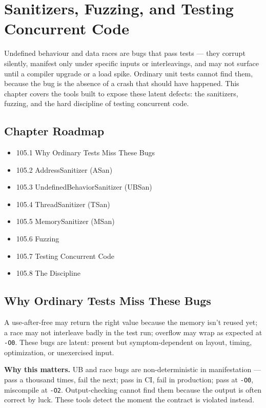 \chapter{Sanitizers, Fuzzing, and Testing Concurrent Code}

Undefined behaviour and data races are bugs that pass tests --- they corrupt silently, manifest only under specific inputs or interleavings, and may not surface until a compiler upgrade or a load spike. Ordinary unit tests cannot find them, because the bug is the absence of a crash that should have happened. This chapter covers the tools built to expose these latent defects: the sanitizers, fuzzing, and the hard discipline of testing concurrent code.

\section*{Chapter Roadmap}
\begin{itemize}
\item 105.1 Why Ordinary Tests Miss These Bugs
\item 105.2 AddressSanitizer (ASan)
\item 105.3 UndefinedBehaviorSanitizer (UBSan)
\item 105.4 ThreadSanitizer (TSan)
\item 105.5 MemorySanitizer (MSan)
\item 105.6 Fuzzing
\item 105.7 Testing Concurrent Code
\item 105.8 The Discipline
\end{itemize}

\section{Why Ordinary Tests Miss These Bugs}
A use-after-free may return the right value because the memory isn't reused yet; a race may not interleave badly in the test run; overflow may wrap as expected at \texttt{-O0}. These bugs are latent: present but symptom-dependent on layout, timing, optimization, or unexercised input.

\textbf{Why this matters.} UB and race bugs are non-deterministic in manifestation --- pass a thousand times, fail the next; pass in CI, fail in production; pass at \texttt{-O0}, miscompile at \texttt{-O2}. Output-checking cannot find them because the output is often correct by luck. These tools detect the moment the contract is violated instead.

